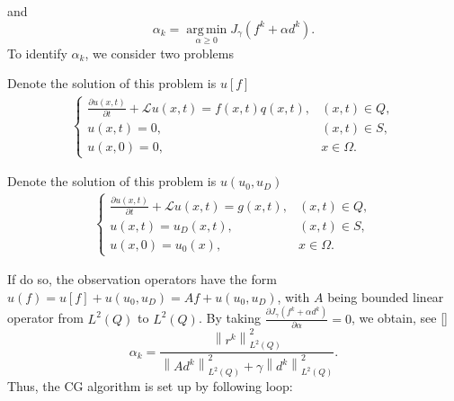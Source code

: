 \documentclass[twocolumn]{article}
\begin{document}
and
$$\alpha_k=\operatorname*{arg\,min}_{\alpha\geq 0}J_\gamma(f^k+\alpha d^k).$$
To identify $\alpha_k$, we consider two problems
\begin{bt}\label{bt2.1}
	Denote the solution of this problem is $u[f]$
	\begin{align*}
		\begin{cases}
			\frac{\partial u(x, t)}{\partial t}+\mathcal{L}u(x, t)=f(x, t)q(x, t),&(x, t)\in Q,\\
			u(x, t)=0, & (x, t)\in S,\\
			u(x, 0)=0,&x\in \Omega.
		\end{cases}
	\end{align*}
\end{bt}
\begin{bt}\label{bt2.2}
	Denote the solution of this problem is $u(u_0, u_D)$
	\begin{align*}
		\begin{cases}
			\frac{\partial u(x, t)}{\partial t}+\mathcal{L}u(x, t)=g(x, t),&(x, t)\in Q,\\
			u(x, t)=u_D(x, t), & (x, t)\in S,\\
			u(x, 0)=u_0(x),&x\in \Omega.
		\end{cases}
	\end{align*}
\end{bt}
\noindent If do so, the observation operators have the form $u(f)= u[f]+ u(u_0, u_D)=Af+ u(u_0, u_D)$, with $A$ being bounded linear operator from $L^2(Q)$ to $L^2(Q)$. By taking $\frac{\partial J_\gamma(f^k+\alpha d^k)}{\partial \alpha}=0$, we obtain, see \eqref{}
$$\alpha_k=\frac{\left\|r^k\right\|^2_{L^2(Q)}}{\displaystyle\left\|Ad^k\right\|^2_{L^2(Q)}+\gamma\left\|d^k\right\|^2_{L^2(Q)}}.$$
Thus, the CG algorithm is set up by following loop:
\end{document}
